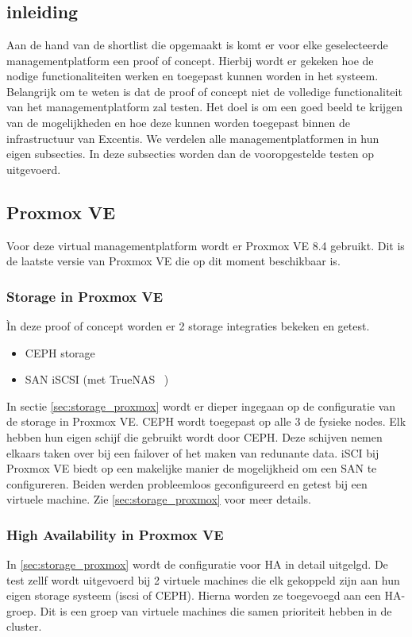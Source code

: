 
\chapter{}%
\label{ch:poc}

\section{inleiding}%
Aan de hand van de shortlist die opgemaakt is komt er voor elke geselecteerde managementplatform een proof of concept. Hierbij wordt er gekeken hoe de nodige functionaliteiten werken en toegepast kunnen worden in het systeem.
Belangrijk om te weten is dat de proof of concept niet de volledige functionaliteit van het managementplatform zal testen. Het doel is om een goed beeld te krijgen van de mogelijkheden en hoe deze kunnen worden toegepast binnen de infrastructuur van Excentis. 
We verdelen alle managementplatformen in hun eigen subsecties. In deze subsecties worden dan de vooropgestelde testen op uitgevoerd.
\section{Proxmox VE}%
Voor deze virtual managementplatform wordt er Proxmox VE 8.4 gebruikt. Dit is de laatste versie van Proxmox VE die op dit moment beschikbaar is.
\subsection{Storage in Proxmox VE}
Ìn deze proof of concept worden er 2 storage integraties bekeken en getest.
\begin{itemize}
    \item CEPH storage
    \item SAN iSCSI (met TrueNAS ~\autocite{truenas})
\end{itemize}
In sectie \autoref{sec:storage_proxmox} wordt er dieper ingegaan op de configuratie van de storage in Proxmox VE.
CEPH wordt toegepast op alle 3 de fysieke nodes. Elk hebben hun eigen schijf die gebruikt wordt door CEPH. Deze schijven nemen elkaars taken over bij een failover of het maken van redunante data.
iSCI bij Proxmox VE biedt op een makelijke manier de mogelijkheid om een SAN te configureren. 
Beiden werden probleemloos geconfigureerd en getest bij een virtuele machine. Zie \ref{sec:storage_proxmox} voor meer details.
\subsection{High Availability in Proxmox VE}
In \autoref{sec:storage_proxmox} wordt de configuratie voor HA in detail uitgelgd.
De test zellf wordt uitgevoerd bij 2 virtuele machines die elk gekoppeld zijn aan hun eigen storage systeem (iscsi of CEPH).
Hierna worden ze toegevoegd aan een HA-groep. Dit is een groep van virtuele machines die samen prioriteit hebben in de cluster.

